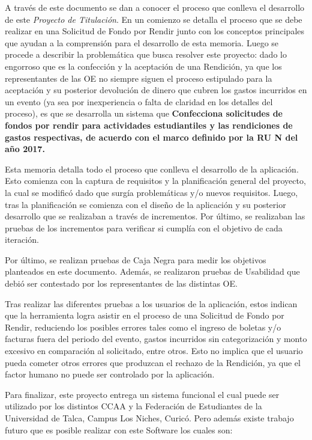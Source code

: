 A través de este documento se dan a conocer el proceso que conlleva el desarrollo de este \textit{Proyecto de Titulación}. En un comienzo se detalla el proceso que se debe realizar en una Solicitud de Fondo por Rendir junto con los conceptos principales que ayudan a la comprensión para el desarrollo de esta memoria. Luego se procede a describir la problemática que busca resolver este proyecto: dado lo engorroso que es la confección y la aceptación de una Rendición, ya que los representantes de las OE no siempre siguen el proceso estipulado para la aceptación y su posterior devolución de dinero que cubren los gastos  incurridos en un evento (ya sea por inexperiencia o falta de claridad en los detalles del proceso), es que se desarrolla un sistema que \textbf{Confecciona solicitudes de fondos por rendir para actividades estudiantiles y las rendiciones de gastos respectivas, de acuerdo con el marco definido por la RU N del año 2017.}

Esta memoria detalla todo el proceso que conlleva el desarrollo de la aplicación. Esto comienza con la captura de requisitos y la planificación general del proyecto, la cual se modificó dado que surgía problemáticas y/o nuevos requisitos. Luego, tras la planificación se comienza con el diseño de la aplicación y su posterior desarrollo que se realizaban a través de incrementos. Por último, se realizaban las pruebas de los incrementos para verificar si cumplía con el objetivo de cada iteración.

Por último, se realizan pruebas de Caja Negra para medir los objetivos planteados en este documento. Además, se realizaron pruebas de Usabilidad que debió ser contestado por los representantes de las distintas OE.

Tras realizar las diferentes pruebas a los usuarios de la aplicación, estos indican que la herramienta logra asistir en el proceso de una Solicitud de Fondo por Rendir, reduciendo los posibles errores tales como el ingreso de boletas y/o facturas fuera del periodo del evento, gastos incurridos sin categorización y monto excesivo en comparación al solicitado, entre otros. Esto no implica que el usuario pueda cometer otros errores que produzcan el rechazo de la Rendición, ya que el factor humano no puede ser controlado por la aplicación. 

Para finalizar, este proyecto entrega un sistema funcional el cual puede ser utilizado por los distintos CCAA y la Federación de Estudiantes de la Universidad de Talca, Campus Los Niches, Curicó. Pero además existe trabajo futuro que es posible realizar con este Software los cuales son:

